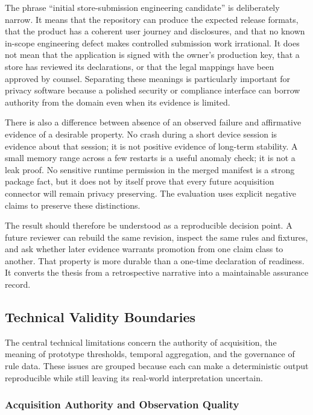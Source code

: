 The phrase ``initial store-submission engineering candidate'' is deliberately narrow. It means that the repository can produce the expected release formats, that the product has a coherent user journey and disclosures, and that no known in-scope engineering defect makes controlled submission work irrational. It does not mean that the application is signed with the owner's production key, that a store has reviewed its declarations, or that the legal mappings have been approved by counsel. Separating these meanings is particularly important for privacy software because a polished security or compliance interface can borrow authority from the domain even when its evidence is limited.

There is also a difference between absence of an observed failure and affirmative evidence of a desirable property. No crash during a short device session is evidence about that session; it is not positive evidence of long-term stability. A small memory range across a few restarts is a useful anomaly check; it is not a leak proof. No sensitive runtime permission in the merged manifest is a strong package fact, but it does not by itself prove that every future acquisition connector will remain privacy preserving. The evaluation uses explicit negative claims to preserve these distinctions.

The result should therefore be understood as a reproducible decision point. A future reviewer can rebuild the same revision, inspect the same rules and fixtures, and ask whether later evidence warrants promotion from one claim class to another. That property is more durable than a one-time declaration of readiness. It converts the thesis from a retrospective narrative into a maintainable assurance record.

\subsection{Technical Validity Boundaries}

The central technical limitations concern the authority of acquisition, the meaning of prototype thresholds, temporal aggregation, and the governance of rule data. These issues are grouped because each can make a deterministic output reproducible while still leaving its real-world interpretation uncertain.

\subsubsection{Acquisition Authority and Observation Quality}

